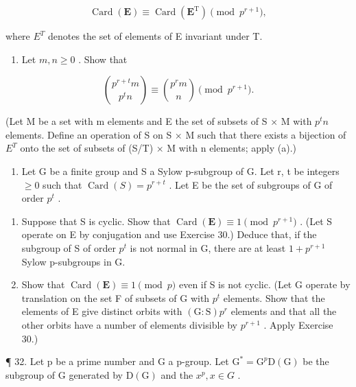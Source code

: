 \[
\operatorname{Card} (\mathbf {E}) \equiv \operatorname{Card} (\mathbf {E} ^ {\mathrm{T}}) \pmod {p ^ {r + 1}},
\]

where \(E^{T}\) denotes the set of elements of E invariant under T.

\begin{enumerate}
\def\labelenumi{(\alph{enumi})}
\setcounter{enumi}{1}
\tightlist
\item
  Let \(m, n \geqslant 0\) . Show that
\end{enumerate}

\[
\binom {p ^ {r + t} m} {p ^ {t} n} \equiv \binom {p ^ {r} m} {n} \pmod {p ^ {r + 1}}.
\]

(Let M be a set with m elements and E the set of subsets of S × M with \(p^{t}n\) elements. Define an operation of S on S × M such that there exists a bijection of \(E^{T}\) onto the set of subsets of (S/T) × M with n elements; apply (a).)

\begin{enumerate}
\def\labelenumi{\arabic{enumi}.}
\setcounter{enumi}{30}
\tightlist
\item
  Let G be a finite group and S a Sylow p-subgroup of G. Let r, t be integers \(\geqslant0\) such that \(\operatorname{Card}(S)=p^{r+t}\) . Let E be the set of subgroups of G of order \(p^{t}\) .
\end{enumerate}

\begin{enumerate}
\def\labelenumi{(\alph{enumi})}
\item
  Suppose that S is cyclic. Show that \(\operatorname{Card}(\mathbf{E}) \equiv 1 \pmod{p^{r+1}}\) . (Let S operate on E by conjugation and use Exercise 30.) Deduce that, if the subgroup of S of order \(p^{t}\) is not normal in G, there are at least \(1 + p^{r+1}\) Sylow p-subgroups in G.
\item
  Show that \(\operatorname{Card}(\mathbf{E}) \equiv 1 \pmod{p}\) even if S is not cyclic. (Let G operate by translation on the set F of subsets of G with \(p^{t}\) elements. Show that the elements of E give distinct orbits with \((\mathrm{G}: \mathrm{S})p^{r}\) elements and that all the other orbits have a number of elements divisible by \(p^{r+1}\) . Apply Exercise 30.)
\end{enumerate}

¶ 32. Let p be a prime number and G a p-group. Let \(\mathrm{G}^{*} = \mathrm{G}^{p}\mathrm{D}(\mathrm{G})\) be the subgroup of G generated by \(\mathrm{D}(\mathrm{G})\) and the \(x^{p}, x \in G\) .

